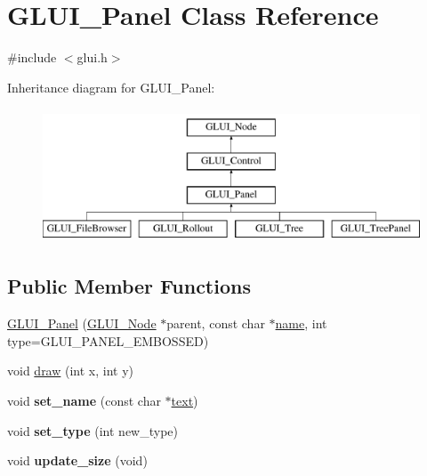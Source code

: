 \hypertarget{classGLUI__Panel}{\section{G\-L\-U\-I\-\_\-\-Panel Class Reference}
\label{classGLUI__Panel}
}


{\ttfamily \#include $<$glui.\-h$>$}

Inheritance diagram for G\-L\-U\-I\-\_\-\-Panel\-:\begin{figure}[H]
\begin{center}
\leavevmode
\includegraphics[height=4.000000cm]{classGLUI__Panel}
\end{center}
\end{figure}
\subsection*{Public Member Functions}
\begin{DoxyCompactItemize}
\item 
\hyperlink{classGLUI__Panel_a6a297a441e3f921199347184ded52aca}{G\-L\-U\-I\-\_\-\-Panel} (\hyperlink{classGLUI__Node}{G\-L\-U\-I\-\_\-\-Node} $\ast$parent, const char $\ast$\hyperlink{classGLUI__Control_aa95b97d50df45335fc33f0af03958eb3}{name}, int type=G\-L\-U\-I\-\_\-\-P\-A\-N\-E\-L\-\_\-\-E\-M\-B\-O\-S\-S\-E\-D)
\item 
void \hyperlink{classGLUI__Panel_a8038a76f6c88613735f7c65ae9466b0c}{draw} (int x, int y)
\item 
\hypertarget{classGLUI__Panel_a5f76f22a34d3c131e3ace71d24c47d3e}{void {\bfseries set\-\_\-name} (const char $\ast$\hyperlink{classGLUI__Control_af0d60e9736f4dbc34e9a536e75876d72}{text})}\label{classGLUI__Panel_a5f76f22a34d3c131e3ace71d24c47d3e}

\item 
\hypertarget{classGLUI__Panel_aee5e41798d60ac2e4707373be14fd39f}{void {\bfseries set\-\_\-type} (int new\-\_\-type)}\label{classGLUI__Panel_aee5e41798d60ac2e4707373be14fd39f}

\item 
\hypertarget{classGLUI__Panel_ab377b608f9b1006fb67d78e41a1f95d6}{void {\bfseries update\-\_\-size} (void)}\label{classGLUI__Panel_ab377b608f9b1006fb67d78e41a1f95d6}

\end{DoxyCompactItemize}
